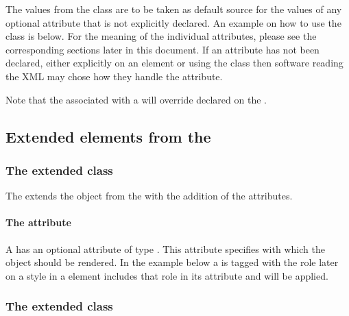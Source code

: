 The values from the \DefaultValues class are to be taken as 
default source for the values of any optional attribute that is not explicitly declared. An example on how to use the \DefaultValues 
class is below. For the meaning of the individual attributes, please see the 
corresponding sections later in this document. If an attribute has not been declared, either explicitly on an element or using the \DefaultValues class then software reading the XML may chose how they handle the attribute.

Note that the \DefaultValues associated with a \ListOfLocalRenderInformation will override \DefaultValues declared on the \ListOfGlobalRenderInformation.



\subsection{Extended elements from the \LayoutPackage}


\subsubsection{The extended  class}
\label{graphicalobject-class}

The \RenderPackage extends the  object from the \LayoutPackage with the
addition of
the  attributes.

\paragraph{The \fixttspace{} attribute}


A \GraphicalObject has an optional attribute  of type
.  This attribute specifies with which \Style the object should be rendered. 
In the example below a \SpeciesGlyph is tagged with the role 
later on a style in a \GlobalRenderInformation element includes that role in its 
 attribute and will be applied.

\pagebreak
{}


\subsubsection{The extended  class}
\label{listoflayouts-class}

